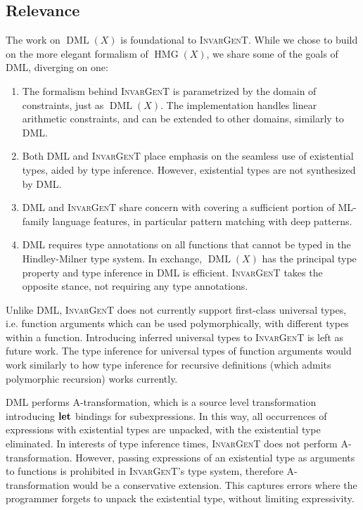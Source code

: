 \documentclass{article}
\newcommand{\tmname}[1]{\textsc{#1}}
\newcommand{\tmop}[1]{\ensuremath{\operatorname{#1}}}
\newcommand{\tmstrong}[1]{\textbf{#1}}
\begin{document}
\subsection{Relevance}

The work on $\tmop{DML} (X)$ is foundational to {\tmname{InvarGenT}}. While we
chose to build on the more elegant formalism of $\tmop{HMG} (X)$, we share
some of the goals of DML, diverging on one:
\begin{enumerate}
  \item The formalism behind {\tmname{InvarGenT}} is parametrized by the
  domain of constraints, just as $\tmop{DML} (X)$. The implementation handles
  linear arithmetic constraints, and can be extended to other domains,
  similarly to DML.
  
  \item Both DML and {\tmname{InvarGenT}} place emphasis on the seamless use
  of existential types, aided by type inference. However, existential types
  are not synthesized by DML.
  
  \item DML and {\tmname{InvarGenT}} share concern with covering a sufficient
  portion of ML-family language features, in particular pattern matching with
  deep patterns.
  
  \item DML requires type annotations on all functions that cannot be typed in
  the Hindley-Milner type system. In exchange, $\tmop{DML} (X)$ has the
  principal type property and type inference in DML is efficient.
  {\tmname{InvarGenT}} takes the opposite stance, not requiring any type
  annotations.
\end{enumerate}
Unlike DML, {\tmname{InvarGenT}} does not currently support first-class
universal types, i.e. function arguments which can be used polymorphically,
with different types within a function. Introducing inferred universal types
to {\tmname{InvarGenT}} is left as future work. The type inference for
universal types of function arguments would work similarly to how type
inference for recursive definitions (which admits polymorphic recursion) works
currently.

DML performs A-transformation, which is a source level transformation
introducing $\text{{\tmstrong{let}}}$ bindings for subexpressions. In this
way, all occurrences of expressions with existential types are unpacked, with
the existential type eliminated. In interests of type inference times,
{\tmname{InvarGenT}} does not perform A-transformation. However, passing
expressions of an existential type as arguments to functions is prohibited in
{\tmname{InvarGenT}}'s type system, therefore A-transformation would be a
conservative extension. This captures errors where the programmer forgets to
unpack the existential type, without limiting expressivity.
\end{document}
